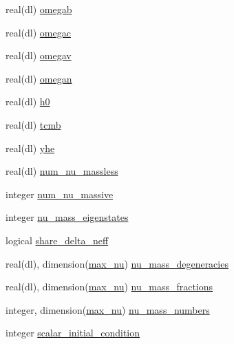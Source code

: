 \begin{DoxyCompactItemize}
\item 
real(dl) \mbox{\hyperlink{structmodelparams_1_1cambparams_a1620023fae483a0330080938ae89377e}{omegab}}
\item 
real(dl) \mbox{\hyperlink{structmodelparams_1_1cambparams_ab9b190c1ab5f90372b13d077c6bdf889}{omegac}}
\item 
real(dl) \mbox{\hyperlink{structmodelparams_1_1cambparams_ac709f5b6500ab29b1d50f209430fd70a}{omegav}}
\item 
real(dl) \mbox{\hyperlink{structmodelparams_1_1cambparams_a90ed3af6c3b078cc5d18bf9bbd722a14}{omegan}}
\item 
real(dl) \mbox{\hyperlink{structmodelparams_1_1cambparams_a70610eb67b2b38263e5a4980cf50857b}{h0}}
\item 
real(dl) \mbox{\hyperlink{structmodelparams_1_1cambparams_a13d0dc1d0e47ef48f4b6759d3c1dc94a}{tcmb}}
\item 
real(dl) \mbox{\hyperlink{structmodelparams_1_1cambparams_a860e64699c36b01374c88a2ace1a3de2}{yhe}}
\item 
real(dl) \mbox{\hyperlink{structmodelparams_1_1cambparams_a33073c39b224bb8f1f8b156b7d14b76b}{num\+\_\+nu\+\_\+massless}}
\item 
integer \mbox{\hyperlink{structmodelparams_1_1cambparams_a7c0d0bffc271d05934009fefbd921644}{num\+\_\+nu\+\_\+massive}}
\item 
integer \mbox{\hyperlink{structmodelparams_1_1cambparams_a218503bfecab497739a8027c559d26e6}{nu\+\_\+mass\+\_\+eigenstates}}
\item 
logical \mbox{\hyperlink{structmodelparams_1_1cambparams_a4fccbe07bbdf598b428e79b44f035423}{share\+\_\+delta\+\_\+neff}}
\item 
real(dl), dimension(\mbox{\hyperlink{namespacemodelparams_a5e3667fcd2aae0fb15654c207fc6830e}{max\+\_\+nu}}) \mbox{\hyperlink{structmodelparams_1_1cambparams_a3c00e0a6110eb3f8998288b0c704edcd}{nu\+\_\+mass\+\_\+degeneracies}}
\item 
real(dl), dimension(\mbox{\hyperlink{namespacemodelparams_a5e3667fcd2aae0fb15654c207fc6830e}{max\+\_\+nu}}) \mbox{\hyperlink{structmodelparams_1_1cambparams_af9072a15d9f5ec62cf847d8a5c5ce30c}{nu\+\_\+mass\+\_\+fractions}}
\item 
integer, dimension(\mbox{\hyperlink{namespacemodelparams_a5e3667fcd2aae0fb15654c207fc6830e}{max\+\_\+nu}}) \mbox{\hyperlink{structmodelparams_1_1cambparams_a7b2f720e136f23c80ae139c302f27fdb}{nu\+\_\+mass\+\_\+numbers}}
\item 
integer \mbox{\hyperlink{structmodelparams_1_1cambparams_a899af3552bb27fdb2c489ef3bc7317ab}{scalar\+\_\+initial\+\_\+condition}}

\end{DoxyCompactItemize}
